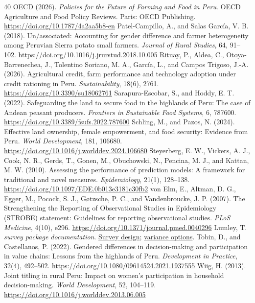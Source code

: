 \documentclass[11pt,a4paper]{article}
\begin{document}
\begin{thebibliography}{40}
 OECD (2026). \emph{Policies for the Future of Farming and Food in Peru}. OECD Agriculture and Food Policy Reviews. Paris: OECD Publishing. \url{https://doi.org/10.1787/4a2aa5b8-en}
 Patel-Campillo, A., and Salas Garc\'ia, V. B. (2018). Un/associated: Accounting for gender difference and farmer heterogeneity among Peruvian Sierra potato small farmers. \emph{Journal of Rural Studies}, 64, 91--102. \url{https://doi.org/10.1016/j.jrurstud.2018.10.005}
 Rituay, P., Aldea, C., Otoya-Barrenechea, J., Tolentino Soriano, M. A., Garc\'ia, L., and Campos Trigoso, J.-A. (2026). Agricultural credit, farm performance and technology adoption under credit rationing in Peru. \emph{Sustainability}, 18(6), 2761. \url{https://doi.org/10.3390/su18062761}
 Sarapura-Escobar, S., and Hoddy, E. T. (2022). Safeguarding the land to secure food in the highlands of Peru: The case of Andean peasant producers. \emph{Frontiers in Sustainable Food Systems}, 6, 787600. \url{https://doi.org/10.3389/fsufs.2022.787600}
 Schling, M., and Pazos, N. (2024). Effective land ownership, female empowerment, and food security: Evidence from Peru. \emph{World Development}, 181, 106680. \url{https://doi.org/10.1016/j.worlddev.2024.106680}
 Steyerberg, E. W., Vickers, A. J., Cook, N. R., Gerds, T., Gonen, M., Obuchowski, N., Pencina, M. J., and Kattan, M. W. (2010). Assessing the performance of prediction models: A framework for traditional and novel measures. \emph{Epidemiology}, 21(1), 128--138. \url{https://doi.org/10.1097/EDE.0b013e3181c30fb2}
 von Elm, E., Altman, D. G., Egger, M., Pocock, S. J., G\o tzsche, P. C., and Vandenbroucke, J. P. (2007). The Strengthening the Reporting of Observational Studies in Epidemiology (STROBE) statement: Guidelines for reporting observational studies. \emph{PLoS Medicine}, 4(10), e296. \url{https://doi.org/10.1371/journal.pmed.0040296}
 Lumley, T. \emph{survey package documentation}. \href{https://r-survey.r-forge.r-project.org/survey/html/svydesign.html}{Survey design}; \href{https://r-survey.r-forge.r-project.org/survey/html/surveyoptions.html}{variance options}.
 Tobin, D., and Castellanos, P. (2022). Gendered differences in decision-making and participation in value chains: Lessons from the highlands of Peru. \emph{Development in Practice}, 32(4), 492--502. \url{https://doi.org/10.1080/09614524.2021.1937555}
 Wiig, H. (2013). Joint titling in rural Peru: Impact on women's participation in household decision-making. \emph{World Development}, 52, 104--119. \url{https://doi.org/10.1016/j.worlddev.2013.06.005}
\end{thebibliography}
\end{document}
